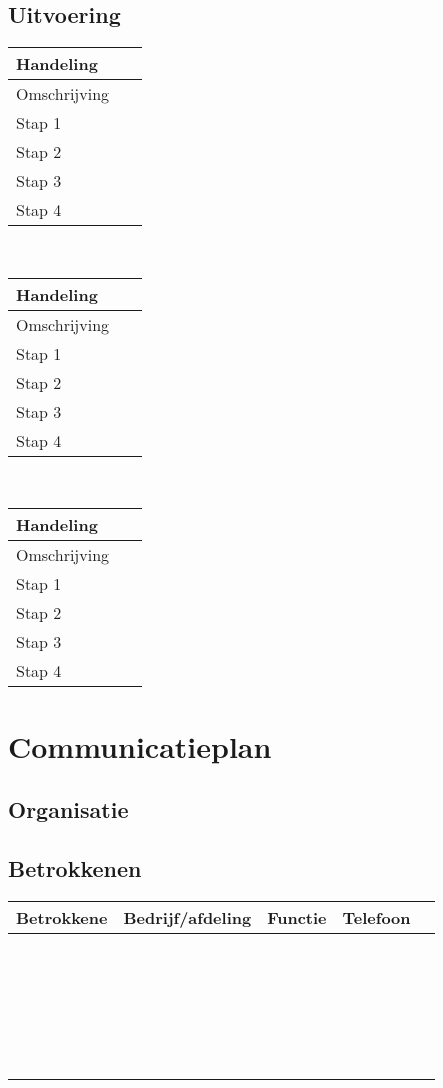 \documentclass[10pt,a4paper]{report}
\begin{document}
\section{Uitvoering}
\begin{tabular}{| l | l |}
\hline
\cellcolor[gray]{0.84}Handeling & \ \\
\hline
\cellcolor[gray]{0.84}Omschrijving & \ \\
\hline
\cellcolor[gray]{0.84}Stap 1 & \ \\
\hline
\cellcolor[gray]{0.84}Stap 2 & \ \\
\hline
\cellcolor[gray]{0.84}Stap 3 & \ \\
\hline
\cellcolor[gray]{0.84}Stap 4 & \ \\
\hline
\end{tabular}
\\

\begin{tabular}{| l | l |}
\hline
\cellcolor[gray]{0.84}Handeling & \ \\
\hline
\cellcolor[gray]{0.84}Omschrijving & \ \\
\hline
\cellcolor[gray]{0.84}Stap 1 & \ \\
\hline
\cellcolor[gray]{0.84}Stap 2 & \ \\
\hline
\cellcolor[gray]{0.84}Stap 3 & \ \\
\hline
\cellcolor[gray]{0.84}Stap 4 & \ \\
\hline
\end{tabular}
\\

\begin{tabular}{| l | l |}
\hline
\cellcolor[gray]{0.84}Handeling & \ \\
\hline
\cellcolor[gray]{0.84}Omschrijving & \ \\
\hline
\cellcolor[gray]{0.84}Stap 1 & \ \\
\hline
\cellcolor[gray]{0.84}Stap 2 & \ \\
\hline
\cellcolor[gray]{0.84}Stap 3 & \ \\
\hline
\cellcolor[gray]{0.84}Stap 4 & \ \\
\hline
\end{tabular}

\chapter{Communicatieplan}
\section{Organisatie}
\section{Betrokkenen}
\begin{tabular}{| l | l | l | l | l|}
\hline
\rowcolor[gray]{0.84}Betrokkene & Bedrijf/afdeling & Functie & Telefoon\\
\hline
\  & \ & \ & \ \\
\hline
\  & \ & \ & \ \\
\hline
\  & \ & \ & \ \\
\hline
\  & \ & \ & \ \\
\hline
\  & \ & \ & \ \\
\hline
\end{tabular}
\end{document}
